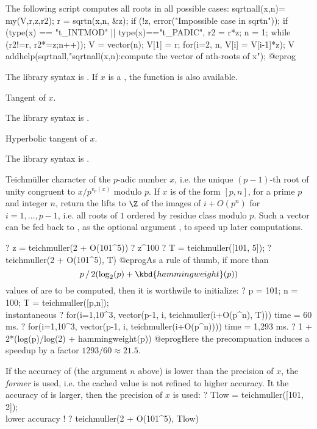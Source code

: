 The following script computes all roots in all possible cases:
\bprog
sqrtnall(x,n)=
{ my(V,r,z,r2);
  r = sqrtn(x,n, &z);
  if (!z, error("Impossible case in sqrtn"));
  if (type(x) == "t_INTMOD" || type(x)=="t_PADIC",
    r2 = r*z; n = 1;
    while (r2!=r, r2*=z;n++));
  V = vector(n); V[1] = r;
  for(i=2, n, V[i] = V[i-1]*z);
  V
}
addhelp(sqrtnall,"sqrtnall(x,n):compute the vector of nth-roots of x");
@eprog\noindent

The library syntax is .
If $x$ is a , the function
 is also available.

\label{se:tan}
Tangent of $x$.

The library syntax is .

\label{se:tanh}
Hyperbolic tangent of $x$.

The library syntax is .

\label{se:teichmuller}
Teichm\"uller character of the $p$-adic number $x$, i.e. the unique
$(p-1)$-th root of unity congruent to $x / p^{v_p(x)}$ modulo $p$.
If $x$ is of the form $[p,n]$, for a prime $p$ and integer $n$,
return the lifts to $\Z$ of the images of $i + O(p^n)$ for
$i = 1, \dots, p-1$, i.e. all roots of $1$ ordered  by residue class modulo
$p$. Such a vector can be fed back to , as the
optional argument , to speed up later computations.

\bprog
? z = teichmuller(2 + O(101^5))
? z^100
? T = teichmuller([101, 5]);
? teichmuller(2 + O(101^5), T)
@eprog\noindent As a rule of thumb, if more than
$$p \,/\, 2(\log_2(p) + \kbd{hammingweight}(p))$$
values of  are to be computed, then it is worthwile to
initialize:
\bprog
? p = 101; n = 100; T = teichmuller([p,n]); \\ instantaneous
? for(i=1,10^3, vector(p-1, i, teichmuller(i+O(p^n), T)))
time = 60 ms.
? for(i=1,10^3, vector(p-1, i, teichmuller(i+O(p^n))))
time = 1,293 ms.
? 1 + 2*(log(p)/log(2) + hammingweight(p))
@eprog\noindent Here the precompuation induces a speedup by a factor
$1293/ 60 \approx 21.5$.

If the accuracy of  (the argument $n$ above) is lower than the
precision of $x$, the \emph{former} is used, i.e. the cached value is not
refined to higher accuracy. It the accuracy of  is larger, then
the precision of $x$ is used:
\bprog
? Tlow = teichmuller([101, 2]); \\ lower accuracy !
? teichmuller(2 + O(101^5), Tlow)

